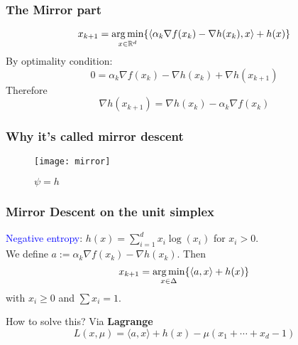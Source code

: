 \documentclass{beamer}
\begin{document}
\begin{frame}
  \frametitle{The Mirror part}
  \begin{equation}
    x_{k+1} = \operatorname*{arg\,min}_{x\in \mathbb{R}^d} \{ \langle \alpha_k \nabla f(x_k) - \nabla h(x_k), x \rangle + h(x) \}
  \end{equation}
  By optimality condition:
  \begin{equation}
    0 = \alpha_k \nabla f(x_k) - \nabla h(x_k) + \nabla h(x_{k+1})
  \end{equation}
  Therefore
  \begin{equation}
    \nabla h(x_{k+1}) =  \nabla h(x_k)  - \alpha_k \nabla f(x_k)
  \end{equation}
\end{frame}


\begin{frame}
  \frametitle{Why it's called mirror descent}
  \begin{figure}[ht]
    \centering
    \texttt{[image: mirror]}
    \caption{$\psi = h$}
  \end{figure}
\end{frame}


\begin{frame}
  \frametitle{Mirror Descent on the unit simplex}
    \textcolor{blue}{Negative entropy}: $h(x) = \sum_{i=1}^{d} x_i \log(x_i)$ for $ x_i > 0$. \\
    We define $a := \alpha_k \nabla f(x_k) - \nabla h(x_k)$. Then
    \begin{equation}
      x_{k+1} = \operatorname*{arg\,min}_{x \in \Delta} \{ \langle a, x \rangle + h(x)\}
    \end{equation}
    with $x_i \ge 0$ and $\sum x_i = 1$.
    \begin{block}{How to solve this?}
      Via \textbf{Lagrange }
      \begin{equation}
        L(x,\mu) = \langle a, x \rangle + h(x) - \mu (x_1+\cdots+ x_d -1)
      \end{equation}
    \end{block}
\end{frame}
\end{document}
